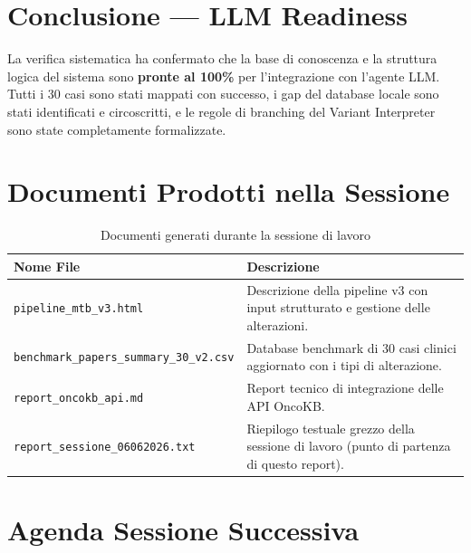 \documentclass[12pt, a4paper]{article}
\begin{document}
\section{Conclusione --- LLM Readiness}

\begin{keyresultbox}
La verifica sistematica ha confermato che la base di conoscenza e la struttura logica del sistema sono \textbf{pronte al 100\%} per l'integrazione con l'agente LLM. Tutti i 30 casi sono stati mappati con successo, i gap del database locale sono stati identificati e circoscritti, e le regole di branching del Variant Interpreter sono state completamente formalizzate.
\end{keyresultbox}

\section{Documenti Prodotti nella Sessione}

\begin{table}[ht]
\centering\renewcommand{\arraystretch}{1.3}
\caption{Documenti generati durante la sessione di lavoro}
\begin{tabular}{lp{9.5cm}}
\toprule
\rowcolor{primaryblue}
\color{white}\textbf{Nome File} & \color{white}\textbf{Descrizione} \\
\midrule
\texttt{pipeline\_mtb\_v3.html} & Descrizione della pipeline v3 con input strutturato e gestione delle alterazioni. \\
\rowcolor{roweven}
\texttt{benchmark\_papers\_summary\_30\_v2.csv} & Database benchmark di 30 casi clinici aggiornato con i tipi di alterazione. \\
\texttt{report\_oncokb\_api.md} & Report tecnico di integrazione delle API OncoKB. \\
\rowcolor{roweven}
\texttt{report\_sessione\_06062026.txt} & Riepilogo testuale grezzo della sessione di lavoro (punto di partenza di questo report). \\
\bottomrule
\end{tabular}
\end{table}

\section{Agenda Sessione Successiva}
\end{document}
